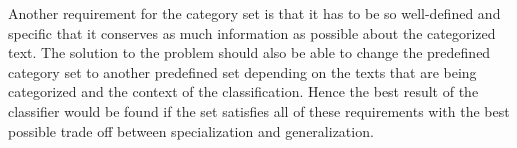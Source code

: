 Another requirement for the category set is that it has to be so well-defined and specific that it conserves as much information as possible about the categorized text. The solution to the problem should also be able to change the predefined category set to another predefined set depending on the texts that are being categorized and the context of the classification.
Hence the best result of the classifier would be found if the set satisfies all of these requirements with the best possible trade off between specialization and generalization. 